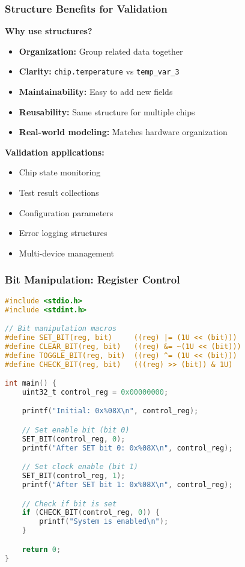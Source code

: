 \documentclass{beamer}
\begin{document}
\begin{frame}
\frametitle{Structure Benefits for Validation}
\textbf{Why use structures?}
\begin{itemize}
    \item \textbf{Organization:} Group related data together
    \item \textbf{Clarity:} \texttt{chip.temperature} vs \texttt{temp\_var\_3}
    \item \textbf{Maintainability:} Easy to add new fields
    \item \textbf{Reusability:} Same structure for multiple chips
    \item \textbf{Real-world modeling:} Matches hardware organization
\end{itemize}

\vspace{0.5cm}
\textbf{Validation applications:}
\begin{itemize}
    \item Chip state monitoring
    \item Test result collections
    \item Configuration parameters
    \item Error logging structures
    \item Multi-device management
\end{itemize}
\end{frame}

\begin{frame}[fragile]
\frametitle{Bit Manipulation: Register Control}
\begin{lstlisting}[language=C, basicstyle=\fontsize{6}{6}\selectfont\ttfamily]
#include <stdio.h>
#include <stdint.h>

// Bit manipulation macros
#define SET_BIT(reg, bit)     ((reg) |= (1U << (bit)))
#define CLEAR_BIT(reg, bit)   ((reg) &= ~(1U << (bit)))
#define TOGGLE_BIT(reg, bit)  ((reg) ^= (1U << (bit)))
#define CHECK_BIT(reg, bit)   (((reg) >> (bit)) & 1U)

int main() {
    uint32_t control_reg = 0x00000000;

    printf("Initial: 0x%08X\n", control_reg);

    // Set enable bit (bit 0)
    SET_BIT(control_reg, 0);
    printf("After SET bit 0: 0x%08X\n", control_reg);

    // Set clock enable (bit 1)
    SET_BIT(control_reg, 1);
    printf("After SET bit 1: 0x%08X\n", control_reg);

    // Check if bit is set
    if (CHECK_BIT(control_reg, 0)) {
        printf("System is enabled\n");
    }

    return 0;
}
\end{lstlisting}
\end{frame}
\end{document}
